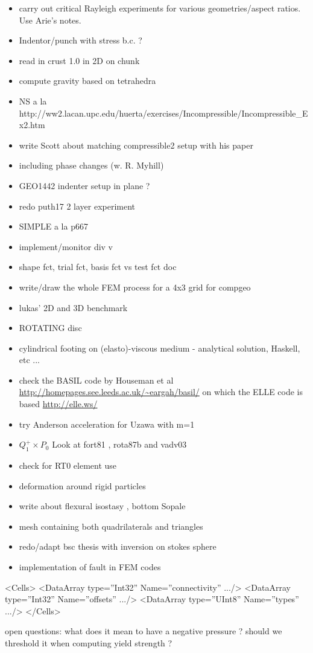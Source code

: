 \begin{itemize}
\item carry out critical Rayleigh experiments for various geometries/aspect ratios. Use Arie's notes. 
\item Indentor/punch with stress b.c. ?
\item read in crust 1.0 in 2D on chunk
\item compute gravity based on tetrahedra
\item NS a la http://ww2.lacan.upc.edu/huerta/exercises/Incompressible/Incompressible\_Ex2.htm
\item write Scott about matching compressible2 setup with his paper
\item including phase changes (w. R. Myhill)
\item GEO1442 indenter setup in plane ?
\item redo puth17 2 layer experiment
\item SIMPLE a la p667 \cite{john16} 
\item implement/monitor div v
\item shape fct, trial fct, basis fct vs test fct doc
\item write/draw the whole FEM process for a 4x3 grid for compgeo
\item lukas' 2D and 3D benchmark
\item ROTATING disc
\item cylindrical footing on (elasto)-viscous medium - analytical solution, Haskell, etc ...
\item check the BASIL code by Houseman et al \url{http://homepages.see.leeds.ac.uk/~eargah/basil/}
on which the ELLE code is based \url{http://elle.ws/} 
\item try Anderson acceleration for Uzawa \cite{hoow17} with m=1
\item $Q_1^+ \times P_0$ Look at fort81 , rota87b and vadv03
\item check \cite{bufm19} for RT0 element use
\item deformation around rigid particles \cite{ilma93}
\item write about flexural isostasy \cite{maie12}, bottom Sopale
\item mesh containing both quadrilaterals and triangles \cite{anbr80}
\item redo/adapt bsc thesis with inversion on stokes sphere
\item implementation of fault in FEM codes \cite{zhgu94,zhgu95}
\end{itemize}

 <Cells>
      <DataArray type=”Int32” Name=”connectivity” .../>
      <DataArray type=”Int32” Name=”offsets” .../>
      <DataArray type=”UInt8” Name=”types” .../>
    </Cells>


open questions:
what does it mean to have a negative pressure ? should we threshold it when computing yield strength ? 
